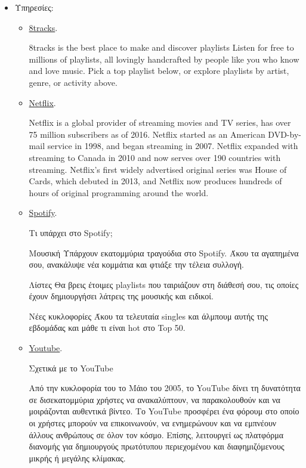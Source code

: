 \begin{itemize}
    \item Υπηρεσίες:
    \begin{itemize}
        \item \href{http://8tracks.com/}{8tracks}.
        \begin{displayquote}
8tracks is the best place to make and discover playlists
Listen for free to millions of playlists, all lovingly handcrafted by people like you who know and love music. Pick a top playlist below, or explore playlists by artist, genre, or activity above.
        \end{displayquote}
        \item \href{https://www.netflix.com/}{Netflix}.
        \begin{displayquote}
Netflix is a global provider of streaming movies and TV series, has over 75 million subscribers as of 2016. Netflix started as an American DVD-by-mail service in 1998, and began streaming in 2007. Netflix expanded with streaming to Canada in 2010 and now serves over 190 countries with streaming. Netflix's first widely advertised original series was House of Cards, which debuted in 2013, and Netflix now produces hundreds of hours of original programming around the world.
        \end{displayquote}
        \item \href{https://www.spotify.com/}{Spotify}.
        \begin{displayquote}
Τι υπάρχει στο Spotify;

Μουσική
Υπάρχουν εκατομμύρια τραγούδια στο Spotify. Άκου τα αγαπημένα σου, ανακάλυψε νέα κομμάτια και φτιάξε την τέλεια συλλογή.

Λίστες
Θα βρεις έτοιμες playlists που ταιριάζουν στη διάθεσή σου, τις οποίες έχουν δημιουργήσει λάτρεις της μουσικής και ειδικοί.

Νέες κυκλοφορίες
Άκου τα τελευταία singles και άλμπουμ αυτής της εβδομάδας και μάθε τι είναι hot στο Top 50.
        \end{displayquote}
        \item \href{https://www.youtube.com/}{Youtube}.
        \begin{displayquote}
Σχετικά με το YouTube

Από την κυκλοφορία του το Μάιο του 2005, το YouTube δίνει τη δυνατότητα σε δισεκατομμύρια χρήστες να ανακαλύπτουν, να παρακολουθούν και να μοιράζονται αυθεντικά βίντεο. Το YouTube προσφέρει ένα φόρουμ στο οποίο οι χρήστες μπορούν να επικοινωνούν, να ενημερώνουν και να εμπνέουν άλλους ανθρώπους σε όλον τον κόσμο. Επίσης, λειτουργεί ως πλατφόρμα διανομής για δημιουργούς πρωτότυπου περιεχομένου και διαφημιζόμενους μικρής ή μεγάλης κλίμακας.


\end{displayquote}
\end{itemize}
\end{itemize}
